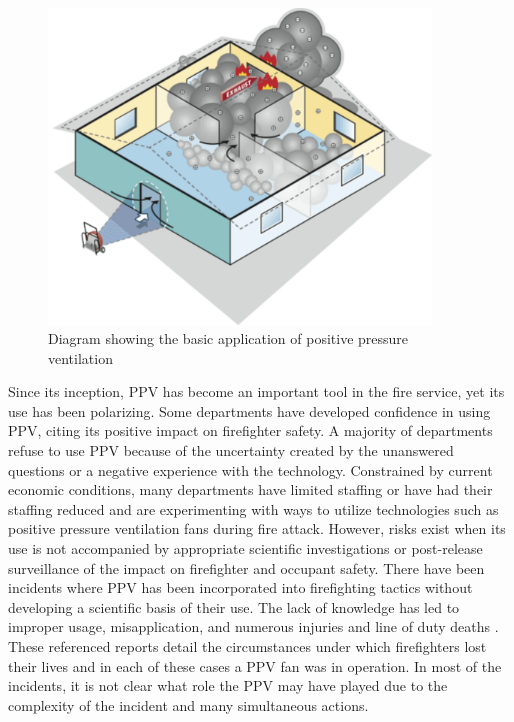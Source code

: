 \documentclass{article}
\begin{document}
\begin{figure}[H]
	\centering
	\includegraphics[width = 4in]{0_Images/Tactical_Considerations/Exhaust_Over_Cone/ppv_illistration.pdf}
	\caption{Diagram showing the basic application of positive pressure ventilation}
	\label{fig:PPV_Diagram}
\end{figure}

Since its inception, PPV has become an important tool in the fire service, yet its use has been polarizing. Some departments have developed confidence in using PPV, citing its positive impact on firefighter safety. A majority of departments refuse to use PPV because of the uncertainty created by the unanswered questions or a negative experience with the technology. Constrained by current economic conditions, many departments have limited staffing or have had their staffing reduced and are experimenting with ways to utilize technologies such as positive pressure ventilation fans during fire attack. However, risks exist when its use is not accompanied by appropriate scientific investigations or post-release surveillance of the impact on firefighter and occupant safety. There have been incidents where PPV has been incorporated into firefighting tactics without developing a scientific basis of their use. The lack of knowledge has led to improper usage, misapplication, and numerous injuries and line of duty deaths \cite{NIOSHF2000-44} \cite{NIOSH98F-32} \cite{TexasFMFY07-02} \cite{ContraCostaFalaityInvestigation} \cite{NIOSHF2004-02} \cite{NIOSHF2002-12}. These referenced reports detail the circumstances under which firefighters lost their lives and in each of these cases a PPV fan was in operation. In most of the incidents, it is not clear what role the PPV may have played due to the complexity of the incident and many simultaneous actions. 
\end{document}
